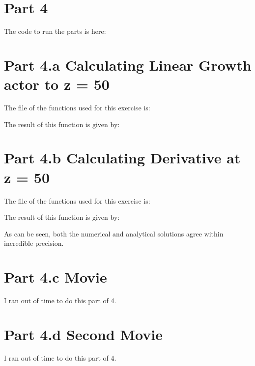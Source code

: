 \section{Part 4}

The code to run the parts is here:



\section{Part 4.a Calculating Linear Growth actor to z = 50}

The file of the functions used for this exercise is:



The result of this function is given by:




\section{Part 4.b Calculating Derivative at z = 50}

The file of the functions used for this exercise is:



The result of this function is given by:



As can be seen, both the numerical and analytical solutions agree within incredible precision.

\section{Part 4.c Movie}

I ran out of time to do this part of 4.

\section{Part 4.d Second Movie}

I ran out of time to do this part of 4.
